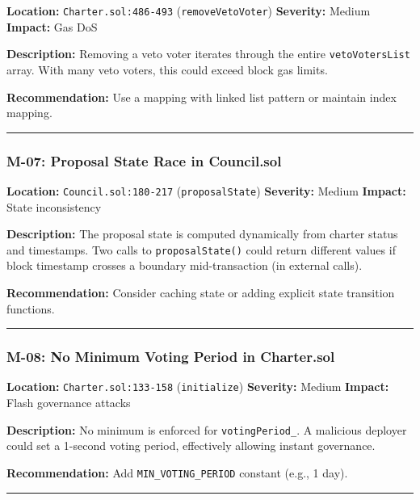 \documentclass[
]{article}
\begin{document}
\textbf{Location:} \texttt{Charter.sol:486-493}
(\texttt{removeVetoVoter}) \textbf{Severity:} Medium \textbf{Impact:}
Gas DoS

\textbf{Description:} Removing a veto voter iterates through the entire
\texttt{vetoVotersList} array. With many veto voters, this could exceed
block gas limits.

\textbf{Recommendation:} Use a mapping with linked list pattern or
maintain index mapping.

\begin{center}\rule{0.5\linewidth}{0.5pt}\end{center}

\subsubsection{M-07: Proposal State Race in
Council.sol}\label{m-07-proposal-state-race-in-councilsol}

\textbf{Location:} \texttt{Council.sol:180-217} (\texttt{proposalState})
\textbf{Severity:} Medium \textbf{Impact:} State inconsistency

\textbf{Description:} The proposal state is computed dynamically from
charter status and timestamps. Two calls to \texttt{proposalState()}
could return different values if block timestamp crosses a boundary
mid-transaction (in external calls).

\textbf{Recommendation:} Consider caching state or adding explicit state
transition functions.

\begin{center}\rule{0.5\linewidth}{0.5pt}\end{center}

\subsubsection{M-08: No Minimum Voting Period in
Charter.sol}\label{m-08-no-minimum-voting-period-in-chartersol}

\textbf{Location:} \texttt{Charter.sol:133-158} (\texttt{initialize})
\textbf{Severity:} Medium \textbf{Impact:} Flash governance attacks

\textbf{Description:} No minimum is enforced for
\texttt{votingPeriod\_}. A malicious deployer could set a 1-second
voting period, effectively allowing instant governance.

\textbf{Recommendation:} Add \texttt{MIN\_VOTING\_PERIOD} constant
(e.g., 1 day).

\begin{center}\rule{0.5\linewidth}{0.5pt}\end{center}
\end{document}
